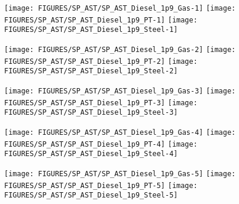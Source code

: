 
\begin{figure}[p]
\begin{center}
\texttt{[image: FIGURES/SP\_AST/SP\_AST\_Diesel\_1p9\_Gas-1]}
\texttt{[image: FIGURES/SP\_AST/SP\_AST\_Diesel\_1p9\_PT-1]}
\texttt{[image: FIGURES/SP\_AST/SP\_AST\_Diesel\_1p9\_Steel-1]}
\end{center}
\label{SP_Diesel_1p9_1m}
\end{figure}

\begin{figure}[p]
\begin{center}
\texttt{[image: FIGURES/SP\_AST/SP\_AST\_Diesel\_1p9\_Gas-2]}
\texttt{[image: FIGURES/SP\_AST/SP\_AST\_Diesel\_1p9\_PT-2]}
\texttt{[image: FIGURES/SP\_AST/SP\_AST\_Diesel\_1p9\_Steel-2]}
\end{center}
\label{SP_Diesel_1p9_2m}
\end{figure}

\begin{figure}[p]
\begin{center}
\texttt{[image: FIGURES/SP\_AST/SP\_AST\_Diesel\_1p9\_Gas-3]}
\texttt{[image: FIGURES/SP\_AST/SP\_AST\_Diesel\_1p9\_PT-3]}
\texttt{[image: FIGURES/SP\_AST/SP\_AST\_Diesel\_1p9\_Steel-3]}
\end{center}
\label{SP_Diesel_1p9_3m}
\end{figure}

\begin{figure}[p]
\begin{center}
\texttt{[image: FIGURES/SP\_AST/SP\_AST\_Diesel\_1p9\_Gas-4]}
\texttt{[image: FIGURES/SP\_AST/SP\_AST\_Diesel\_1p9\_PT-4]}
\texttt{[image: FIGURES/SP\_AST/SP\_AST\_Diesel\_1p9\_Steel-4]}
\end{center}
\label{SP_Diesel_1p9_4m}
\end{figure}

\begin{figure}[p]
\begin{center}
\texttt{[image: FIGURES/SP\_AST/SP\_AST\_Diesel\_1p9\_Gas-5]}
\texttt{[image: FIGURES/SP\_AST/SP\_AST\_Diesel\_1p9\_PT-5]}
\texttt{[image: FIGURES/SP\_AST/SP\_AST\_Diesel\_1p9\_Steel-5]}
\end{center}
\label{SP_Diesel_1p9_5m}
\end{figure}



